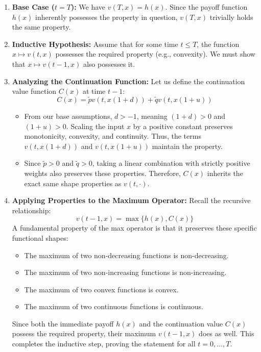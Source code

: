 \begin{enumerate}
    \item \textbf{Base Case ($t=T$):} We have $v(T,x) = h(x)$. Since the payoff function $h(x)$ inherently possesses the property in question, $v(T,x)$ trivially holds the same property.
    
    \item \textbf{Inductive Hypothesis:} Assume that for some time $t \le T$, the function $x \mapsto v(t,x)$ possesses the required property (e.g., convexity). We must show that $x \mapsto v(t-1,x)$ also possesses it.
    
    \item \textbf{Analyzing the Continuation Function:} Let us define the continuation value function $C(x)$ at time $t-1$:
    \begin{equation*}
        C(x) = \tilde{p} v(t, x(1+d)) + \tilde{q} v(t, x(1+u))
    \end{equation*}
    \begin{itemize}
        \item From our base assumptions, $d > -1$, meaning $(1+d) > 0$ and $(1+u) > 0$. Scaling the input $x$ by a positive constant preserves monotonicity, convexity, and continuity. Thus, the terms $v(t, x(1+d))$ and $v(t, x(1+u))$ maintain the property.
        \item Since $\tilde{p} > 0$ and $\tilde{q} > 0$, taking a linear combination with strictly positive weights also preserves these properties. Therefore, $C(x)$ inherits the exact same shape properties as $v(t,\cdot)$.
    \end{itemize}
    
    \item \textbf{Applying Properties to the Maximum Operator:} 
    Recall the recursive relationship:
    \begin{equation*}
        v(t-1, x) = \max\{h(x), C(x)\}
    \end{equation*}
    A fundamental property of the max operator is that it preserves these specific functional shapes:
    \begin{itemize}
        \item The maximum of two non-decreasing functions is non-decreasing.
        \item The maximum of two non-increasing functions is non-increasing.
        \item The maximum of two convex functions is convex.
        \item The maximum of two continuous functions is continuous.
    \end{itemize}
    Since both the immediate payoff $h(x)$ and the continuation value $C(x)$ possess the required property, their maximum $v(t-1, x)$ does as well. This completes the inductive step, proving the statement for all $t=0,\dots,T$.
\end{enumerate}